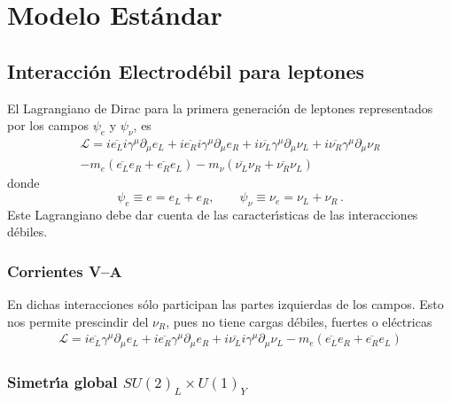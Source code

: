 \chapter{Modelo Est\'andar}
\label{cha:modelo-estandar} %

\section{Interacci\'on Electrod\'ebil para leptones}
\label{sec:inter-electr}
El Lagrangiano de Dirac para la primera generaci\'on de leptones representados por los campos $\psi_e$ y $\psi_\nu$, es
\begin{align}
\mathcal{L}=i\overline{e_L}i\gamma^\mu\partial_\mu e_L+i\overline{e_R}i\gamma^\mu\partial_\mu e_R
  +i\overline{\nu_L}\gamma^\mu\partial_\mu\nu_L+i\overline{\nu_R}\gamma^\mu\partial_\mu\nu_R\nonumber\\
  -m_e(\overline{e_L}e_R+\overline{e_R}e_L)
  -m_\nu(\overline{\nu_L}\nu_R+\overline{\nu_R}\nu_L)
\end{align}
donde
\begin{equation}
  \psi_e\equiv e=e_L+e_R,\qquad \psi_\nu\equiv\nu_e=\nu_L+\nu_R\,.
\end{equation}
Este Lagrangiano debe dar cuenta de las caracter\'\i sticas de las interacciones d\'ebiles.
\subsection*{Corrientes V--A}
\label{sec:corrientes-v}
En dichas interacciones s\'olo participan las partes izquierdas de los campos. Esto nos permite prescindir del $\nu_R$, pues no tiene cargas d\'ebiles, fuertes o el\'ectricas
\begin{align}
  \label{eq:261}
  \mathcal{L}=i\overline{e_L}\gamma^\mu\partial_\mu e_L+i\overline{e_R}\gamma^\mu\partial_\mu e_R
  +i\overline{\nu_L}i\gamma^\mu\partial_\mu\nu_L-m_e(\overline{e_L}e_R+\overline{e_R}e_L)
\end{align}

\subsection*{Simetr\'\i a global $SU(2)_L\times U(1)_Y$}
\label{sec:simetr-glob-su2_l}

